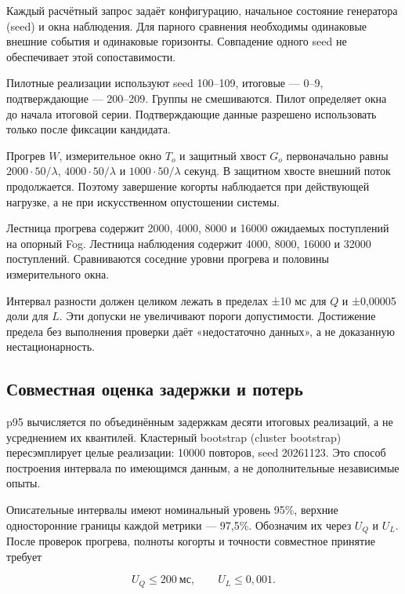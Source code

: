 Каждый расчётный запрос задаёт конфигурацию, начальное состояние генератора (seed) и окна наблюдения. Для парного сравнения необходимы одинаковые внешние события и одинаковые горизонты. Совпадение одного seed не обеспечивает этой сопоставимости.

Пилотные реализации используют seed 100--109, итоговые --- 0--9, подтверждающие --- 200--209. Группы не смешиваются. Пилот определяет окна до начала итоговой серии. Подтверждающие данные разрешено использовать только после фиксации кандидата.

Прогрев \(W\), измерительное окно \(T_o\) и защитный хвост \(G_o\) первоначально равны \(2000\cdot50/\lambda\), \(4000\cdot50/\lambda\) и \(1000\cdot50/\lambda\) секунд. В защитном хвосте внешний поток продолжается. Поэтому завершение когорты наблюдается при действующей нагрузке, а не при искусственном опустошении системы.

Лестница прогрева содержит 2000, 4000, 8000 и 16000 ожидаемых поступлений на опорный Fog. Лестница наблюдения содержит 4000, 8000, 16000 и 32000 поступлений. Сравниваются соседние уровни прогрева и половины измерительного окна.

Интервал разности должен целиком лежать в пределах ±10 мс для \(Q\) и ±0,00005 доли для \(L\). Эти допуски не увеличивают пороги допустимости. Достижение предела без выполнения проверки даёт «недостаточно данных», а не доказанную нестационарность.

\hypertarget{ux441ux43eux432ux43cux435ux441ux442ux43dux430ux44f-ux43eux446ux435ux43dux43aux430-ux437ux430ux434ux435ux440ux436ux43aux438-ux438-ux43fux43eux442ux435ux440ux44c}{%
\subsection{Совместная оценка задержки и потерь}}

p95 вычисляется по объединённым задержкам десяти итоговых реализаций, а не усреднением их квантилей. Кластерный bootstrap (cluster bootstrap) пересэмплирует целые реализации: 10000 повторов, seed 20261123. Это способ построения интервала по имеющимся данным, а не дополнительные независимые опыты.

Описательные интервалы имеют номинальный уровень 95\%, верхние односторонние границы каждой метрики --- 97,5\%. Обозначим их через \(U_Q\) и \(U_L\). После проверок прогрева, полноты когорты и точности совместное принятие требует

\begin{equation}\label{eq:5}
U_Q\leq200\ \text{мс},\qquad U_L\leq0{,}001.
\end{equation}

